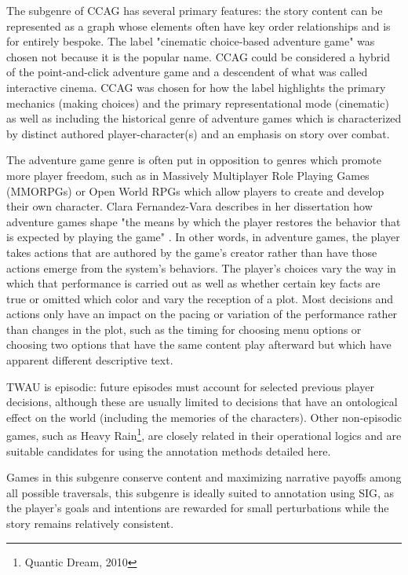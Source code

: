 The subgenre of CCAG has several primary features: the story content
can be represented as a graph whose elements often have key order
relationships and is for entirely bespoke. The label "cinematic
choice-based adventure game" was chosen not because it is the popular
name. CCAG could be considered a hybrid of the point-and-click
adventure game and a descendent of what was called interactive
cinema. CCAG was chosen for how the label highlights the primary
mechanics (making choices) and the primary representational mode
(cinematic) as well as including the historical genre of adventure
games which is characterized by distinct authored player-character(s)
and an emphasis on story over combat.

The adventure game genre is often put in opposition to genres which
promote more player freedom, such as in Massively Multiplayer Role
Playing Games (MMORPGs) or Open World RPGs which allow players to
create and develop their own character. Clara Fernandez-Vara describes
in her dissertation how adventure games shape "the means by which the
player restores the behavior that is expected by playing the game"
\cite{Fernandez_Vara2009-mt}. In other words, in adventure games, the
player takes actions that are authored by the game's creator rather
than have those actions emerge from the system's behaviors. The
player's choices vary the way in which that performance is carried out
as well as whether certain key facts are true or omitted which color
and vary the reception of a plot. Most decisions and actions only have
an impact on the pacing or variation of the performance rather than
changes in the plot, such as the timing for choosing menu options or
choosing two options that have the same content play afterward but
which have apparent different descriptive text.

TWAU is episodic: future episodes must account for selected previous
player decisions, although these are usually limited to decisions that
have an ontological effect on the world (including the memories of the
characters). Other non-episodic games, such as Heavy Rain\footnote{Quantic Dream, 2010}, are
closely related in their operational logics and are suitable
candidates for using the annotation methods detailed here.

Games in this subgenre conserve content and maximizing narrative
payoffs among all possible traversals, this subgenre is ideally suited
to annotation using SIG, as the player's goals and intentions are
rewarded for small perturbations while the story remains relatively
consistent.

